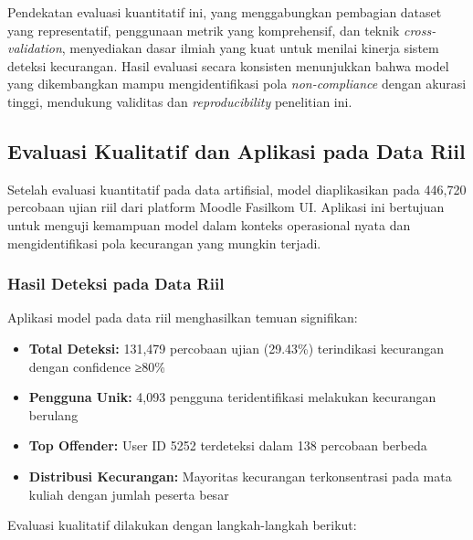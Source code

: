 Pendekatan evaluasi kuantitatif ini, yang menggabungkan pembagian dataset yang representatif, penggunaan metrik yang komprehensif, dan teknik \textit{cross-validation}, menyediakan dasar ilmiah yang kuat untuk menilai kinerja sistem deteksi kecurangan. Hasil evaluasi secara konsisten menunjukkan bahwa model yang dikembangkan mampu mengidentifikasi pola \textit{non-compliance} dengan akurasi tinggi, mendukung validitas dan \textit{reproducibility} penelitian ini.

\subsection{Evaluasi Kualitatif dan Aplikasi pada Data Riil}
\label{sec:evaluasiKualitatifStudiKasus}
Setelah evaluasi kuantitatif pada data artifisial, model diaplikasikan pada 446,720 percobaan ujian riil dari platform Moodle Fasilkom UI. Aplikasi ini bertujuan untuk menguji kemampuan model dalam konteks operasional nyata dan mengidentifikasi pola kecurangan yang mungkin terjadi.

\subsubsection{Hasil Deteksi pada Data Riil}
Aplikasi model pada data riil menghasilkan temuan signifikan:
\begin{itemize}
    \item \textbf{Total Deteksi:} 131,479 percobaan ujian (29.43\%) terindikasi kecurangan dengan confidence ≥80\%
    \item \textbf{Pengguna Unik:} 4,093 pengguna teridentifikasi melakukan kecurangan berulang
    \item \textbf{Top Offender:} User ID 5252 terdeteksi dalam 138 percobaan berbeda
    \item \textbf{Distribusi Kecurangan:} Mayoritas kecurangan terkonsentrasi pada mata kuliah dengan jumlah peserta besar
\end{itemize}

Evaluasi kualitatif dilakukan dengan langkah-langkah berikut:

